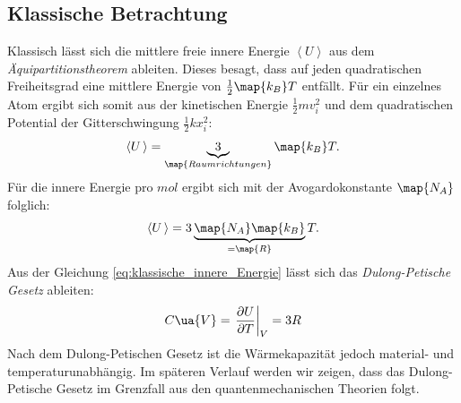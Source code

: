 \subsection{Klassische Betrachtung}
Klassisch lässt sich die mittlere freie innere Energie $\left<U\right>$ aus dem
\emph{Äquipartitionstheorem} ableiten. Dieses besagt, dass auf jeden quadratischen
Freiheitsgrad eine mittlere Energie von $\frac{1}{2}\map{k_B}T$ entfällt.
Für ein einzelnes Atom ergibt sich somit aus der kinetischen Energie $\frac{1}{2}mv_i^2$ und
dem quadratischen Potential der Gitterschwingung $\frac{1}{2}kx_i^2$:
\begin{equation}
  \label{eq:innere_Energie}
  \left<U\,\right> = \underbrace{3}_{\map{Raumrichtungen}}\map{k_B}T.
\end{equation}
Für die innere Energie pro $\si{mol}$ ergibt sich mit der Avogardokonstante
$\map{N_A}$ folglich:
\begin{equation}
  \label{eq:klassische_innere_Energie}
  \left<U\,\right> = 3\underbrace{\map{N_A} \map{k_B}}_{=\map{R}} T.
\end{equation}
Aus der Gleichung \eqref{eq:klassische_innere_Energie} lässt sich das
\emph{Dulong-Petische Gesetz} ableiten:
\begin{equation}
  \label{eq:dulong_petit}
  C\ua{V}=\left. \frac{\partial U}{\partial T}\right|_{V}=3R
\end{equation}
Nach dem Dulong-Petischen Gesetz ist die Wärmekapazität jedoch material- und
temperaturunabhängig. Im späteren Verlauf werden wir zeigen, dass das Dulong-Petische Gesetz
im Grenzfall aus den quantenmechanischen Theorien folgt.

